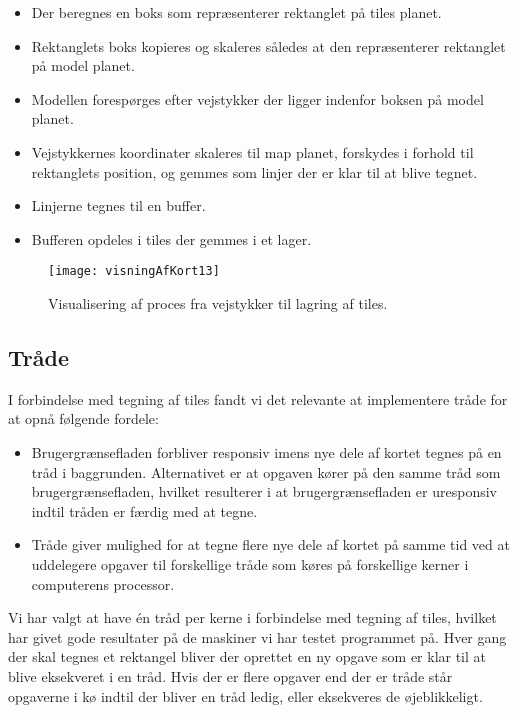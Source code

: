 \begin{itemize}
	\item Der beregnes en boks som repræsenterer rektanglet på tiles planet.
	\item Rektanglets boks kopieres og skaleres således at den repræsenterer rektanglet på model planet.
	\item Modellen forespørges efter vejstykker der ligger indenfor boksen på model planet.
	\item Vejstykkernes koordinater skaleres til map planet, forskydes i forhold til rektanglets position, og gemmes som linjer der er klar til at blive tegnet.
	\item Linjerne tegnes til en buffer.
	\item Bufferen opdeles i tiles der gemmes i et lager.
\end{itemize}

\begin{figure}[h]
	\centering
	\texttt{[image: visningAfKort13]}
	\captionsetup{width=0.8\textwidth}
	\caption{Visualisering af proces fra vejstykker til lagring af tiles.}
	\label{figur:visningAfKort13}
\end{figure}

\subsection{Tråde}
\label{subsec:traade}

I forbindelse med tegning af tiles fandt vi det relevante at implementere tråde for at opnå følgende fordele:

\begin{itemize}
	\item Brugergrænsefladen forbliver responsiv imens nye dele af kortet tegnes på en tråd i baggrunden. Alternativet er at opgaven kører på den samme tråd som brugergrænsefladen, hvilket resulterer i at brugergrænsefladen er uresponsiv indtil tråden er færdig med at tegne.
	\item Tråde giver mulighed for at tegne flere nye dele af kortet på samme tid ved at uddelegere opgaver til forskellige tråde som køres på forskellige kerner i computerens processor.
\end{itemize}

Vi har valgt at have én tråd per kerne i forbindelse med tegning af tiles, hvilket har givet gode resultater på de maskiner vi har testet programmet på. Hver gang der skal tegnes et rektangel bliver der oprettet en ny opgave som er klar til at blive eksekveret i en tråd. Hvis der er flere opgaver end der er tråde står opgaverne i kø indtil der bliver en tråd ledig, eller eksekveres de øjeblikkeligt.

